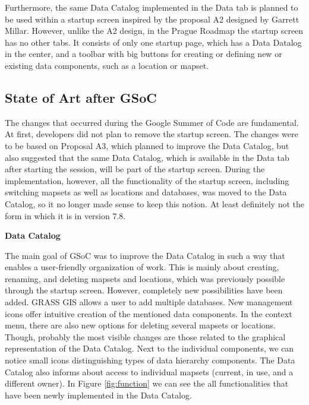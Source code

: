 \documentclass[a4paper,10pt,twoside]{article}
\begin{document}
Furthermore, the same Data Catalog implemented in the Data tab is planned to be used within a startup screen inspired by the proposal A2 designed by Garrett Millar. However, unlike the A2 design, in the Prague Roadmap the startup screen has no other tabs. It consists of only one startup page, which has a Data Datalog in the center, and a toolbar with big buttons for creating or defining new or existing data components, such as a location or mapset.


\subsection{State of Art after GSoC}
\label{sec:afterGSoC}

\noindent The changes that occurred during the Google Summer of Code are fundamental. At first, developers did not plan to remove the startup screen. The changes were to be based on Proposal A3, which planned to improve the Data Catalog, but also suggested that the same Data Catalog, which is available in the Data tab after starting the session, will be part of the startup screen. During the implementation, however, all the functionality of the startup screen, including switching mapsets as well as locations and databases, was moved to the Data Catalog, so it no longer made sense to keep this notion. At least definitely not the form in which it is in version 7.8.

\bigskip
\noindent \textbf {Data Catalog}

\noindent The main goal of GSoC was to improve the Data Catalog in such a way that enables a user-friendly organization of work. This is mainly about creating, renaming, and deleting mapsets and locations, which was previously possible through the startup screen. However, completely new possibilities have been added. GRASS GIS allows a user to add multiple databases. New management icons offer intuitive creation of the mentioned data components. In the context menu, there are also new options for deleting several mapsets or locations. Though, probably the most visible changes are those related to the graphical representation of the Data Catalog. Next to the individual components, we can notice small icons distinguishing types of data hierarchy components. The Data Catalog also informs about access to individual mapsets (current, in use, and a different owner). In Figure \ref{fig:function} we can see the all functionalities that have been newly implemented in the Data Catalog. 
\end{document}
